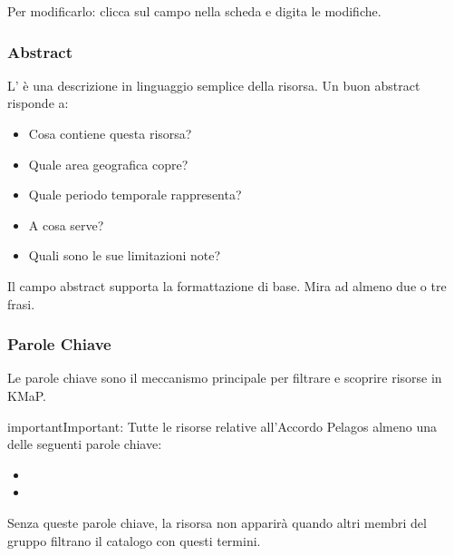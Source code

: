 \documentclass[letterpaper,10pt,english]{sphinxmanual}
\begin{document}
\sphinxAtStartPar
Per modificarlo: clicca sul campo  nella scheda  e digita le
modifiche.


\subsubsection{Abstract}
\label{\detokenize{it/03_gestire_metadati:abstract}}
\sphinxAtStartPar
L’ è una descrizione in linguaggio semplice della risorsa. Un buon abstract
risponde a:
\begin{itemize}
\item {} 
\sphinxAtStartPar
Cosa contiene questa risorsa?

\item {} 
\sphinxAtStartPar
Quale area geografica copre?

\item {} 
\sphinxAtStartPar
Quale periodo temporale rappresenta?

\item {} 
\sphinxAtStartPar
A cosa serve?

\item {} 
\sphinxAtStartPar
Quali sono le sue limitazioni note?

\end{itemize}

\sphinxAtStartPar
Il campo abstract supporta la formattazione di base. Mira ad almeno due o tre frasi.


\subsubsection{Parole Chiave}
\label{\detokenize{it/03_gestire_metadati:parole-chiave}}
\sphinxAtStartPar
Le parole chiave sono il meccanismo principale per filtrare e scoprire risorse in KMaP.

\begin{sphinxadmonition}{important}{Important:}
\sphinxAtStartPar
Tutte le risorse relative all’Accordo Pelagos  almeno una delle
seguenti parole chiave:
\begin{itemize}
\item {} 
\sphinxAtStartPar
{}

\item {} 
\sphinxAtStartPar
{}

\end{itemize}

\sphinxAtStartPar
Senza queste parole chiave, la risorsa non apparirà quando altri membri del gruppo
filtrano il catalogo con questi termini.
\end{sphinxadmonition}
\end{document}
